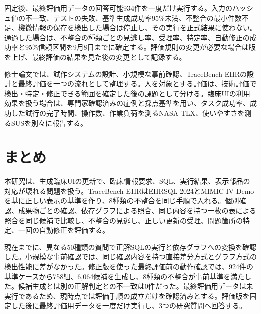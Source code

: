 \documentclass[a4paper]{jsarticle}
\begin{document}
固定後、最終評価用データの回答可能934件を一度だけ実行する。入力のハッシュ値の不一致、テストの失敗、基準生成成功率95\%未満、不整合の最小件数不足、機微情報の保存を検出した場合は停止し、その実行を正式結果に使わない。通過した場合は、不整合の種類ごとの見逃し率、受理率、特定率、自動修正の成功率と95\%信頼区間を9月8日までに確定する。評価規則の変更が必要な場合は版を上げ、最終評価の結果を見た後の変更として記録する。

修士論文では、試作システムの設計、小規模な事前確認、TraceBench-EHRの設計と最終評価を一つの流れとして整理する。人を対象とする評価は、技術評価で検出・特定・修正できる範囲を確定した後の課題として分ける。臨床UIの利用効果を扱う場合は、専門家確認済みの症例と採点基準を用い、タスク成功率、成功した試行の完了時間、操作数、作業負荷を測るNASA-TLX、使いやすさを測るSUSを別々に報告する。

\section{まとめ}

本研究は、生成臨床UIの更新で、臨床情報要求、SQL、実行結果、表示部品の対応が壊れる問題を扱う。TraceBench-EHRはEHRSQL-2024とMIMIC-IV Demoを基に正しい表示の基準を作り、8種類の不整合を同じ手順で入れる。個別確認、成果物ごとの確認、依存グラフによる照合、同じ内容を持つ一枚の表による照合を同じ候補で比較し、不整合の見逃し、正しい更新の受理、問題箇所の特定、一回の自動修正を評価する。

現在までに、異なる50種類の質問で正解SQLの実行と依存グラフへの変換を確認した。小規模な事前確認では、同じ確認内容を持つ直接差分方式とグラフ方式の検出性能に差がなかった。修正版を使った最終評価前の動作確認では、924件の基準ケースから758組、6,064候補を生成し、8種類の不整合が事前基準を満たした。候補生成とは別の正解判定との不一致は0件だった。最終評価用データは未実行であるため、現時点では評価手順の成立だけを確認済みとする。評価版を固定した後に最終評価用データを一度だけ実行し、3つの研究質問へ回答する。



\end{document}
